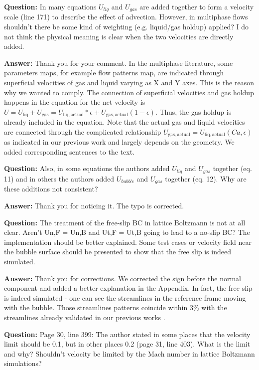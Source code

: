 \documentclass{article}
\begin{document}
\textbf{Question:} In many equations $U_{liq}$ and $U_{gas}$ are added together to form a velocity scale (line 171) to describe the effect of advection. However, in multiphase flows shouldn't there be some kind of weighting (e.g. liquid/gas holdup) applied? I do not think the physical meaning is clear when the two velocities are directly added.

\textbf{Answer:} Thank you for your comment.  In the multiphase literature,  some parameters maps, for example flow patterns map, are indicated through superficial velocities of gas and liquid varying as X and Y axes. This is the reason why we wanted to comply. The connection of superficial velocities and gas holdup happens in the equation for the net velocity is $U=U_{\mathrm{liq}} + U_{\mathrm{gas}}=U_{\mathrm{liq,actual}}*\epsilon+U_{\mathrm{gas,actual}} (1-\epsilon)$. Thus, the gas holdup is already included in the equation. Note that the actual gas and liquid velocities are connected through the complicated relationship $U_{\mathrm{gas,actual}}=U_{\mathrm{liq,actual}}(Ca,\epsilon)$ as indicated in our previous work and largely depends on the geometry. We added corresponding sentences to the text.

\textbf{Question:} Also, in some equations the authors added $U_{liq}$ and $U_{gas}$ together (eq. 11) and in others the authors added $U_{bubble}$ and $U_{gas}$ together (eq. 12). Why are these additions not consistent?

\textbf{Answer:} Thank you for noticing it. The typo is corrected. 

\textbf{Question:} The treatment of the free-slip BC in lattice Boltzmann is not at all clear. Aren't Un,F = Un,B and Ut,F = Ut,B going to lead to a no-slip BC? The implementation should be better explained. Some test cases or velocity field near the bubble surface should be presented to show that the free slip is indeed simulated.

\textbf{Answer:} Thank you for corrections. We corrected the sign before the normal component and added a better explanation in  the Appendix. In fact, the free slip is indeed simulated  - one can see the streamlines in the reference frame moving with the bubble. Those streamlines patterns coincide within $3\%$ with the streamlines already validated in our previous works \cite{kuzmin-binary2d,kuzmin-binary3d}.

\textbf{Question:} Page 30, line 399: The author stated in some places that the velocity limit should be 0.1, but in other places 0.2 (page 31, line 403). What is the limit and why? Shouldn't velocity be limited by the Mach number in lattice Boltzmann simulations?
\end{document}
